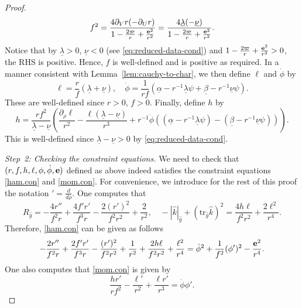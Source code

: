 \documentclass[10pt, reqno]{amsart}
\theoremstyle{definition}
\theoremstyle{remark}
\theoremstyle{conjecture}
\numberwithin{equation}{section}
\newcommand{\rd}{\partial}
\newcommand{\0}{\emptyset}
\newcommand{\alp}{\alpha}
\newcommand{\bt}{\beta}
\newcommand{\lmb}{\lambda}
\newcommand{\bfe}{{\bf e}}
\newcommand{\dur}{\nu}
\newcommand{\dvr}{\lmb}
\newcommand{\f}{\frac}
\newcommand{\pfstep}[1]{\vspace{.5em} {\it \noindent #1.}}
\newcommand{\e}{\bfe}							%
\begin{document}
\begin{proof}
\begin{equation} \label{eq:reduced-data:f}
	f^{2} = \frac{4 \rd_{V} r (-\rd_{U} r)}{1-\frac{2 \varpi}{r} + \frac{\e^{2}}{r^{2}}}=\frac{4 \underline{\dvr} (-\underline{\dur})}{1-\frac{2 \varpi}{r} + \frac{\e^{2}}{r^{2}}}.
\end{equation}
Notice that by $\underline{\dvr}>0$, $\underline{\dur}<0$ (see \eqref{eq:reduced-data-cond}) and $1-\frac{2 \varpi}{r} + \frac{\e^{2}}{r^{2}}>0$, the RHS is positive. Hence, $f$ is well-defined and is positive as required. In a manner consistent with Lemma~\ref{lem:cauchy-to-char}, we then define $\ell$ and $\dot{\phi}$ by 
\begin{equation}\label{eq:reduced-data:ell-phidot}
\ell= \f{r}{f}(\underline{\dvr}+\underline{\dur}),\quad \dot{\phi}=\f{1}{rf}(\underline{\alp}-r^{-1}\underline{\dvr}\psi+\underline{\bt}-r^{-1}\underline{\dur}\psi).
\end{equation}
These are well-defined since $r>0$, $f>0$.
Finally, define $h$ by
\begin{equation} \label{eq:reduced-data:h}
h=\f{rf^2}{\underline{\dvr} - \underline{\dur}}\left(\f{\rd_\rho \ell}{r^2}-\f{\ell (\underline{\dvr} - \underline{\dur})}{r^3}+r^{-1}\dot{\phi}\left((\underline{\alp}-r^{-1}\underline{\dvr}\psi)-(\underline{\bt}-r^{-1}\underline{\dur}\psi)\right)\right).
\end{equation}
This is well-defined since $\underline{\dvr} - \underline{\dur}>0$ by \eqref{eq:reduced-data-cond}.


\pfstep{Step~2: Checking the constraint equations} We need to check that $(r, f, h, \ell, \phi, \dot{\phi}, \e)$ defined as above indeed satisfies the constraint equations \eqref{ham.con} and \eqref{mom.con}. For convenience, we introduce for the rest of this proof the notation $'=\f{d}{d\rho}$. One computes that
$$R_{\hat{g}}=-\f{4r''}{f^2 r}+ \f{4f'r'}{f^3 r}-\f{2(r')^2}{f^2r^2}+\f 2{r^2},\quad -|\hat{k}|_{\hat{g}}+(\mbox{tr}_{\hat{g}}\hat{k})^2=\f{4h\ell}{f^2 r^2}+\f{2\ell^2}{r^4}.$$
Therefore, \eqref{ham.con} can be given as follows
\begin{equation}\label{ham.con.2}
-\f{2r''}{f^2 r}+ \f{2f'r'}{f^3 r}-\f{(r')^2}{f^2r^2}+\f {1}{r^2}+\f{2h\ell}{f^2 r^2}+\f{\ell^2}{r^4}=\dot{\phi}^2+\f {1}{f^2} (\phi')^2-\f{\e^2}{r^4}.
\end{equation}
One also computes that \eqref{mom.con} is given by
\begin{equation}\label{mom.con.2}
\f{hr'}{rf^2}-\f{\ell'}{r^2}+\f{\ell r'}{r^3}=\dot{\phi}\phi'.
\end{equation}


\end{proof}
\end{document}
